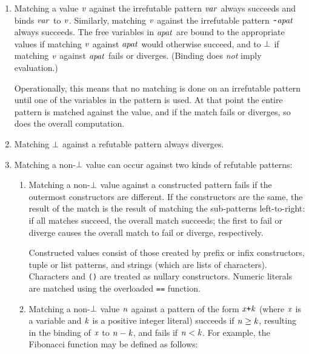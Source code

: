 \begin{enumerate}
\item Matching a value \mbox{$\it v$} against the irrefutable pattern
\mbox{$\it var$} always succeeds and binds \mbox{$\it var$} to \mbox{$\it v$}.  Similarly, matching \mbox{$\it v$}
against the irrefutable pattern \mbox{$\it \makebox{\tt {\char'176}}apat$} always succeeds.  The free
variables in \mbox{$\it apat$} are bound to the appropriate values if matching
\mbox{$\it v$} against \mbox{$\it apat$} would otherwise succeed, and to \mbox{$\it \bot$} if matching
\mbox{$\it v$} against \mbox{$\it apat$} fails or diverges.  (Binding does {\em
not} imply evaluation.)

Operationally, this means that no matching is done on an
irrefutable pattern until one of the variables in the pattern is used.
At that point the entire pattern is matched against the value, and if
the match fails or diverges, so does the overall computation.

\item Matching \mbox{$\it \bot$} against a refutable pattern always diverges.

\item Matching a non-\mbox{$\it \bot$} value can occur against two kinds of
refutable patterns:
\begin{enumerate}
\item Matching a non-\mbox{$\it \bot$} value against a constructed pattern
fails if the outermost constructors are different.  If the constructors are
the same, the result of the match is the result of matching the
sub-patterns left-to-right: if all matches succeed, the overall match
succeeds; the first to fail or diverge causes the overall match to
fail or diverge, respectively.  

Constructed values consist of those created by prefix or infix
constructors, tuple or list patterns, and strings (which are
lists of characters).  Characters and \mbox{\tt ()} are treated as
nullary constructors.  Numeric literals are matched using the
overloaded \mbox{\tt ==} function.


\item Matching a non-\mbox{$\it \bot$} value \mbox{$\it n$} against a pattern of the form
\mbox{$\it x\makebox{\tt +}k$}
(where \mbox{$\it x$} is a variable and \mbox{$\it k$} is a positive integer
literal) succeeds if \mbox{$\it n\geq k$}, resulting in the binding of \mbox{$\it x$} to \mbox{$\it n-k$},
and fails if \mbox{$\it n<k$}.  For example, the Fibonacci function may be
defined as follows:


\end{enumerate}
\end{enumerate}
